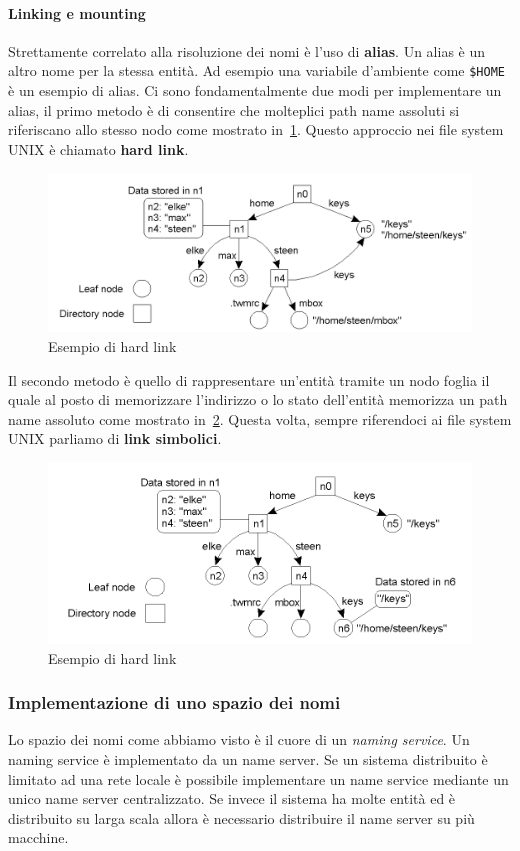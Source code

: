 \paragraph{Linking e mounting}
Strettamente correlato alla risoluzione dei nomi è l'uso di \textbf{alias}. Un alias è un altro nome per la stessa entità. Ad esempio una variabile d'ambiente come \texttt{\$HOME} è un esempio di alias. Ci sono fondamentalmente due modi per implementare un alias, il primo metodo è di consentire che molteplici path name assoluti si riferiscano allo stesso nodo  come mostrato in \figurename\,\ref{img:hardlink}. Questo approccio nei file system UNIX è chiamato \textbf{hard link}. 
\begin{figure}[htb]
\centering
\includegraphics[scale=0.5]{img/hardlink.png}
\caption{Esempio di hard link}\label{img:hardlink}
\end{figure}
Il secondo metodo è quello di rappresentare un'entità tramite un nodo foglia il quale al posto di memorizzare l'indirizzo o lo stato dell'entità memorizza un path name assoluto come mostrato in \figurename\,\ref{img:symboliclink}. Questa volta, sempre riferendoci ai file system UNIX parliamo di \textbf{link simbolici}.
\begin{figure}[htb]
\centering
\includegraphics[scale=0.5]{img/symboliclink.png}
\caption{Esempio di hard link}\label{img:symboliclink}
\end{figure}
\subsubsection{Implementazione di uno spazio dei nomi}
Lo spazio dei nomi come abbiamo visto è il cuore di un \emph{naming service}. Un naming service è implementato da un name server. Se un sistema distribuito è limitato ad una rete locale è possibile implementare un name service mediante un unico name server centralizzato. Se invece il sistema ha molte entità ed è distribuito su larga scala allora è necessario distribuire il name server su più macchine.
